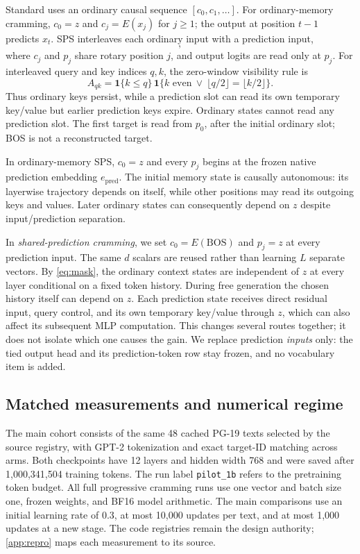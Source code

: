 \documentclass{article}
\begin{document}
Standard uses an ordinary causal sequence $[c_0,c_1,\ldots]$.
For ordinary-memory cramming, $c_0=z$ and $c_j=E(x_j)$ for $j\ge1$; the output at position $t-1$ predicts $x_t$.
SPS interleaves each ordinary input with a prediction input,
\begin{equation}
 [c_0,p_0,c_1,p_1,\ldots,c_L,p_L],
 \label{eq:interleave}
\end{equation}
where $c_j$ and $p_j$ share rotary position $j$, and output logits are read only at $p_j$.
For interleaved query and key indices $q,k$, the zero-window visibility rule is
\begin{equation}
 A_{qk}=\mathbf{1}\{k\le q\}\,
 \mathbf{1}\{k\text{ even}\ \lor\ \lfloor q/2\rfloor=\lfloor k/2\rfloor\}.
 \label{eq:mask}
\end{equation}
Thus ordinary keys persist, while a prediction slot can read its own temporary key/value but earlier prediction keys expire.
Ordinary states cannot read any prediction slot.
The first target is read from $p_0$, after the initial ordinary slot; BOS is not a reconstructed target.

In ordinary-memory SPS, $c_0=z$ and every $p_j$ begins at the frozen native prediction embedding $e_{\mathrm{pred}}$.
The initial memory state is causally autonomous: its layerwise trajectory depends on itself, while other positions may read its outgoing keys and values.
Later ordinary states can consequently depend on $z$ despite input/prediction separation.

In \emph{shared-prediction cramming}, we set $c_0=E(\mathrm{BOS})$ and $p_j=z$ at every prediction input.
The same $d$ scalars are reused rather than learning $L$ separate vectors.
By \cref{eq:mask}, the ordinary context states are independent of $z$ at every layer conditional on a fixed token history.
During free generation the chosen history itself can depend on $z$.
Each prediction state receives direct residual input, query control, and its own temporary key/value through $z$, which can also affect its subsequent MLP computation.
This changes several routes together; it does not isolate which one causes the gain.
We replace prediction \emph{inputs} only: the tied output head and its prediction-token row stay frozen, and no vocabulary item is added.

\subsection{Matched measurements and numerical regime}

The main cohort consists of the same 48 cached PG-19 texts selected by the source registry, with GPT-2 tokenization and exact target-ID matching across arms.
Both checkpoints have 12 layers and hidden width 768 and were saved after 1,000,341,504 training tokens.
The run label \texttt{pilot\_1b} refers to the pretraining token budget.
All full progressive cramming runs use one vector and batch size one, frozen weights, and BF16 model arithmetic.
The main comparisons use an initial learning rate of 0.3, at most 10,000 updates per text, and at most 1,000 updates at a new stage.
The code registries remain the design authority; \cref{app:repro} maps each measurement to its source.
\end{document}
